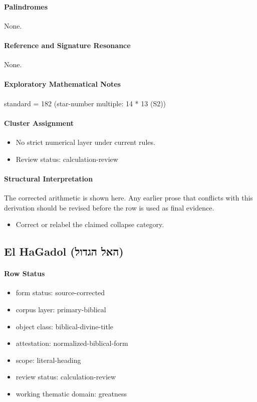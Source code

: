 \paragraph{Palindromes}
None.
\paragraph{Reference and Signature Resonance}
None.
\paragraph{Exploratory Mathematical Notes}
standard = 182 (star-number multiple: 14 * 13 (S2))
\paragraph{Cluster Assignment}
\begin{itemize}
\item No strict numerical layer under current rules.
\item Review status: calculation-review
\end{itemize}
\paragraph{Structural Interpretation}
The corrected arithmetic is shown here. Any earlier prose that conflicts with this derivation should be revised before the row is used as final evidence.

\begin{itemize}
\item Correct or relabel the claimed collapse category.
\end{itemize}

\subsection{El HaGadol (האל הגדול)}
\paragraph{Row Status}
\begin{itemize}
\item form status: source-corrected
\item corpus layer: primary-biblical
\item object class: biblical-divine-title
\item attestation: normalized-biblical-form
\item scope: literal-heading
\item review status: calculation-review
\item working thematic domain: greatness
\end{itemize}

